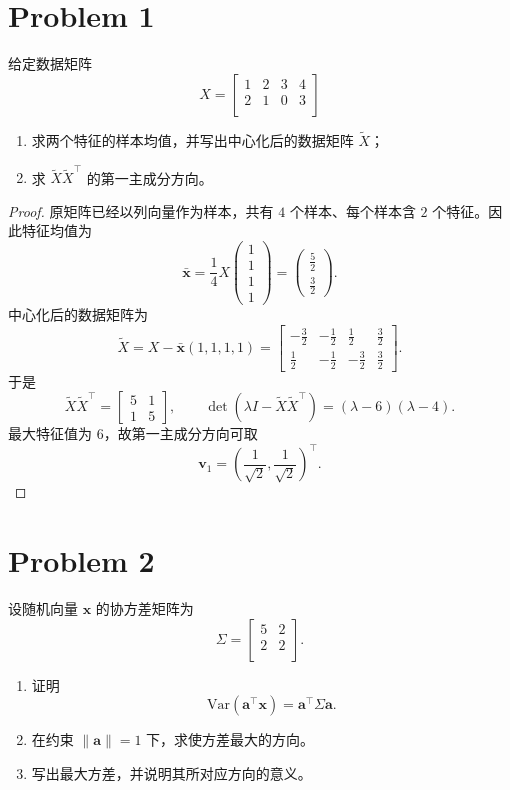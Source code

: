 \section*{Problem 1}

给定数据矩阵 \[
X = \begin{bmatrix}
    1 & 2 & 3 & 4 \\
    2 & 1 & 0 & 3 \\
\end{bmatrix}
\]
\begin{enumerate}
    \item 求两个特征的样本均值，并写出中心化后的数据矩阵 $\tilde{X}$；
    \item 求 $\tilde{X}\tilde{X}^\top$ 的第一主成分方向。
\end{enumerate}

\begin{proof}
原矩阵已经以列向量作为样本，共有 $4$ 个样本、每个样本含 $2$ 个特征。因此特征均值为
\[
\bar{\boldsymbol{x}}
=\frac14X\begin{pmatrix}1\\1\\1\\1\end{pmatrix}
=\begin{pmatrix}\frac52\\[1mm]\frac32\end{pmatrix}.
\]
中心化后的数据矩阵为
\[
\tilde X
=X-\bar{\boldsymbol{x}}(1,1,1,1)
=\boxed{\begin{bmatrix}
-\frac32 & -\frac12 & \frac12 & \frac32\\
\frac12 & -\frac12 & -\frac32 & \frac32
\end{bmatrix}}.
\]
于是
\[
\tilde X\tilde X^\top
=\begin{bmatrix}5&1\\1&5\end{bmatrix},
\qquad
\det\left(\lambda I-\tilde X\tilde X^\top\right)
=(\lambda-6)(\lambda-4).
\]
最大特征值为 $6$，故第一主成分方向可取
\[
\boxed{\boldsymbol v_1=\left(\frac1{\sqrt2},\frac1{\sqrt2}\right)^\top}.
\]
\end{proof}

\section*{Problem 2}

设随机向量 $\boldsymbol{x}$ 的协方差矩阵为 \[
\Sigma = \begin{bmatrix}
    5 & 2 \\
    2 & 2 \\
\end{bmatrix}.
\]
\begin{enumerate}
    \item 证明 \[\mathrm{Var} \left(\boldsymbol{a}^\top \boldsymbol{x} \right) = \boldsymbol{a}^\top \Sigma \boldsymbol{a}.\]
    \item 在约束 $\left\|\boldsymbol{a}\right\| = 1$ 下，求使方差最大的方向。
    \item 写出最大方差，并说明其所对应方向的意义。
\end{enumerate}

